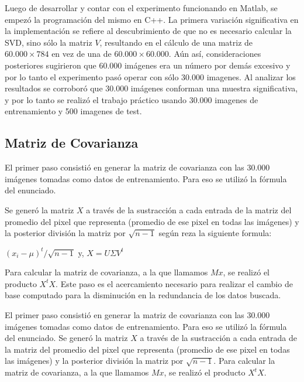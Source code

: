 Luego de desarrollar y contar con el experimento funcionando en Matlab, se empez\'o la programaci\'on
del mismo en C++. La primera variaci\'on significativa en la implementaci\'on se refiere al
descubrimiento de que no es necesario calcular la SVD, sino s\'olo la matriz $V$, resultando
en el c\'alculo de una matriz de $60.000 \times 784$ en vez de una de $60.000 \times 60.000$.
A\'un as\'i, consideraciones posteriores sugirieron que 60.000 im\'agenes era un n\'umero por
dem\'as excesivo y por lo tanto el experimento pas\'o operar con s\'olo 30.000 imagenes.
Al analizar los resultados se corrobor\'o que 30.000 im\'agenes conforman una muestra significativa,
y por lo tanto se realiz\'o el trabajo pr\'actico usando 30.000 imagenes de entrenamiento y 500 imagenes de test.

\subsection{Matriz de Covarianza}

El primer paso consisti\'o en generar la matriz de covarianza con las 30.000
im\'agenes tomadas como datos de entrenamiento. Para eso se utiliz\'o la f\'ormula del enunciado.

Se gener\'o la matriz $X$ a trav\'es de la sustracci\'on a cada entrada de la 
matriz del promedio del pixel que representa (promedio de ese pixel en todas las 
im\'agenes) y la posterior divisi\'on la matriz por $\sqrt{n-1}$ seg\'un reza la
siguiente formula:
\\

\centerline{$(x_i - \mu)^{t}/\sqrt{n-1}$ y, $X=U \Sigma V^t$}
\bigskip
Para calcular la matriz de covarianza, a la que llamamos $Mx$, se realiz\'o el
producto $X^tX$. Este paso es el acercamiento necesario para realizar el cambio
de base computado para la disminuci\'on en la redundancia de los datos buscada.

El primer paso consisti\'o en generar la matriz de covarianza con las 30.000
im\'agenes tomadas como datos de entrenamiento. Para eso se utiliz\'o la f\'ormula del enunciado. 
Se gener\'o la matriz $X$ a trav\'es de la sustracci\'on a cada entrada de la
matriz del promedio del pixel que representa (promedio de ese pixel en todas las im\'agenes) 
y la posterior divisi\'on la matriz por $\sqrt{n-1}$. Para calcular la
matriz de covarianza, a la que llamamos $Mx$, se realiz\'o el producto $X^tX$.

